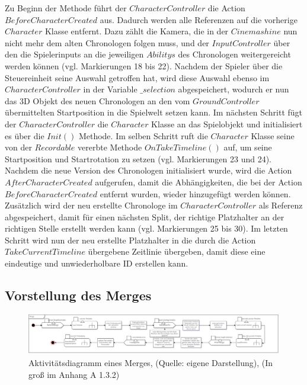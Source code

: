 Zu Beginn der Methode führt der $CharacterController$ die Action \\ $BeforeCharacterCreated$ aus. Dadurch werden alle Referenzen auf die vorherige $Character$ Klasse entfernt. Dazu zählt die Kamera, die in der $Cinemashine$ nun nicht mehr dem alten Chronologen folgen muss, und der $InputController$ über den die Spielerinputs an die jeweiligen $Abilitys$ des Chronologen weitergereicht werden können (vgl. Markierungen 18 bis 22). Nachdem der Spieler über die Steuereinheit seine Auswahl getroffen hat, wird diese Auswahl ebenso im $CharacterController$ in der Variable $\_selection$ abgespeichert, wodurch er nun das \ac{3D} Objekt des neuen Chronologen an den vom $GroundController$ übermittelten Startposition in die Spielwelt setzen kann. Im nächsten Schritt fügt der $CharacterController$ die $Character$ Klasse an das Spielobjekt und initialisiert es über die $Init()$ Methode. Im selben Schritt ruft die $Character$ Klasse seine von der $Recordable$ vererbte Methode $OnTakeTimeline()$ auf, um seine Startposition und Startrotation zu setzen (vgl. Markierungen 23 und 24). Nachdem die neue Version des Chronologen initialisiert wurde, wird die Action $AfterCharacterCreated$ aufgerufen, damit die Abhängigkeiten, die bei der Action $BeforeCharacterCreated$ entfernt wurden, wieder hinzugefügt werden können. Zusätzlich wird der neu erstellte Chronologe im $CharacterController$ als Referenz abgespeichert, damit für einen nächsten Split, der richtige Platzhalter an der richtigen Stelle erstellt werden kann (vgl. Markierungen 25 bis 30). Im letzten Schritt wird nun der neu erstellte Platzhalter in die durch die Action $TakeCurrentTimeline$ übergebene Zeitlinie übergeben, damit diese eine eindeutige und unwiederholbare \ac{ID} erstellen kann.

\subsection{Vorstellung des Merges}\label{sec:merge_prototype}

\begin{figure}[ht]
\centering
\includegraphics[width=1\linewidth]{content/pictures/Merge_uml.jpg}
\caption{Aktivitätsdiagramm eines Merges, (Quelle: eigene Darstellung), (In groß im Anhang A 1.3.2)}
\label{fig:merge-uml}
\end{figure}

